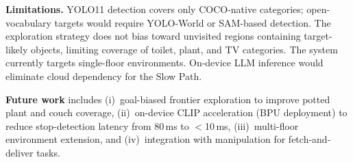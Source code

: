 \documentclass[conference]{IEEEtran}
\begin{document}
\textbf{Limitations.}
YOLO11 detection covers only COCO-native categories; open-vocabulary targets would require YOLO-World or SAM-based detection.
The exploration strategy does not bias toward unvisited regions containing target-likely objects, limiting coverage of toilet, plant, and TV categories.
The system currently targets single-floor environments.
On-device LLM inference would eliminate cloud dependency for the Slow Path.

\textbf{Future work} includes (i)~goal-biased frontier exploration to improve potted plant and couch coverage, (ii)~on-device CLIP acceleration (BPU deployment) to reduce stop-detection latency from 80\,ms to $<$10\,ms, (iii)~multi-floor environment extension, and (iv)~integration with manipulation for fetch-and-deliver tasks.

\balance

\end{document}
